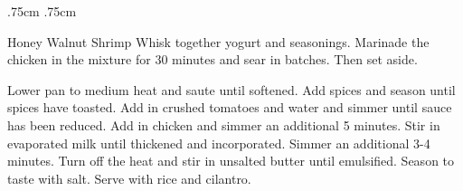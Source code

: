 \documentclass[]{article}
\title{}
\author{}
\begin{document}
\RecipeWidths{\textwidth}{3cm}{0.5cm}{5cm} {.75cm} {.75cm}
\begin{recipe}{Honey Walnut Shrimp}{}{}	
	Whisk together yogurt and seasonings. Marinade the chicken in the mixture for 30 minutes and sear in batches. Then set aside. 
	
	Lower pan to medium heat and saute until softened. 
	Add spices and season until spices have toasted.
	Add in crushed tomatoes and water and simmer until sauce has been reduced. Add in chicken and simmer an additional 5 minutes.
	Stir in evaporated milk until thickened and incorporated. Simmer an additional 3-4 minutes.
	Turn off the heat and stir in unsalted butter until emulsified. Season to taste with salt. Serve with rice and cilantro.
\end{recipe}
\end{document}
